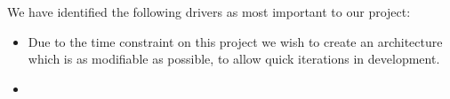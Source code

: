 We have identified the following drivers as most important to our project:
\begin{itemize}
	\item Due to the time constraint on this project we wish to create an 	
	architecture which is as modifiable as possible, to allow quick iterations
	in development.
	\item 
\end{itemize}
